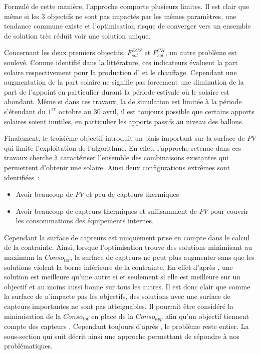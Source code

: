Formulé de cette manière, l’approche comporte plusieurs limites. Il est clair que même si
les \num{3} objectifs ne sont pas impactés par les mêmes paramètres, une tendance commune
existe et l’optimisation risque de converger vers un ensemble de solution très réduit voir
une solution unique.

Concernant les deux premiers objectifs, $F_{sol}^{ECS}$ et $F_{sol}^{CH}$, un autre
problème est soulevé. Comme identifié dans la littérature, ces indicateurs évaluent la
part solaire respectivement pour la production d’ et le chauffage. Cependant une
augmentation de la part solaire ne signifie pas forcement une diminution de la part de
l’appoint en particulier durant la période estivale où le solaire est abondant. Même si
dans ces travaux, la de simulation est limitée à la période s’étendant du $1^{er}$ octobre
au $30$ avril, il est toujours possible que certains apports solaires soient inutiles, en
particulier les apports passifs au niveau des ballons.

Finalement, le troisième objectif introduit un biais important sur la surface de $PV$
qui limite l’exploitation de l’algorithme. En effet, l’approche retenue dans ces travaux
cherche à caractériser l’ensemble des combinaisons existantes qui permettent d’obtenir
une  solaire. Ainsi deux configurations extrêmes sont identifiées~:
\begin{itemize}
  \item Avoir beaucoup de $PV$ et peu de capteurs thermiques
  \item Avoir beaucoup de capteurs thermiques et suffisamment de $PV$ pour couvrir
        les consommations des équipements internes.
\end{itemize}
Cependant la surface de capteurs  est uniquement prise en compte dans le calcul de
la contrainte. Ainsi, lorsque l’optimisation trouve des solutions minimisant au maximum la
$Conso_{tot}$, la surface de capteurs  ne peut plus augmenter sans que les
solutions violent la borne inférieure de la contrainte. En effet d’après
, une solution est meilleure qu’une autre si et seulement
si elle est meilleure sur un objectif et au moins aussi bonne sur tous les autres. Il est
donc clair que comme la surface de  n’impacte pas les objectifs, des solutions
avec une surface de capteurs  importantes ne sont pas atteignables. Il pourrait
être considéré la minimisation de la $Conso_{tot}$ en place de la $Conso_{app}$ afin qu’un
objectif tiennent compte des capteurs . Cependant toujours d’après
, le problème reste entier. La sous-section qui suit
décrit ainsi une approche permettant de répondre à nos problématiques.


